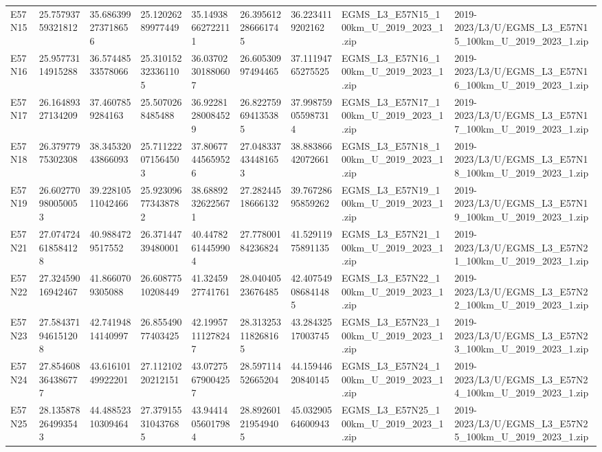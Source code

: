 \begin{landscape}
\begin{longtable}{lllllllll}
E57N15 & 25.75793759321812 & 35.686399273718656 & 25.12026289977449 & 35.14938662722111 & 26.395612286661745 & 36.2234119202162 & EGMS\_L3\_E57N15\_100km\_U\_2019\_2023\_1.zip & 2019-2023/L3/U/EGMS\_L3\_E57N15\_100km\_U\_2019\_2023\_1.zip \\
E57N16 & 25.95773114915288 & 36.57448533578066 & 25.310152323361105 & 36.03702301880607 & 26.60530997494465 & 37.11194765275525 & EGMS\_L3\_E57N16\_100km\_U\_2019\_2023\_1.zip & 2019-2023/L3/U/EGMS\_L3\_E57N16\_100km\_U\_2019\_2023\_1.zip \\
E57N17 & 26.16489327134209 & 37.4607859284163 & 25.5070268485488 & 36.92281280084529 & 26.822759694135385 & 37.998759055987314 & EGMS\_L3\_E57N17\_100km\_U\_2019\_2023\_1.zip & 2019-2023/L3/U/EGMS\_L3\_E57N17\_100km\_U\_2019\_2023\_1.zip \\
E57N18 & 26.37977975302308 & 38.34532043866093 & 25.711222071564503 & 37.80677445659526 & 27.048337434481653 & 38.88386642072661 & EGMS\_L3\_E57N18\_100km\_U\_2019\_2023\_1.zip & 2019-2023/L3/U/EGMS\_L3\_E57N18\_100km\_U\_2019\_2023\_1.zip \\
E57N19 & 26.602770980050053 & 39.22810511042466 & 25.923096773438782 & 38.68892326225671 & 27.28244518666132 & 39.76728695859262 & EGMS\_L3\_E57N19\_100km\_U\_2019\_2023\_1.zip & 2019-2023/L3/U/EGMS\_L3\_E57N19\_100km\_U\_2019\_2023\_1.zip \\
E57N21 & 27.074724618584128 & 40.9884729517552 & 26.37144739480001 & 40.44782614459904 & 27.77800184236824 & 41.52911975891135 & EGMS\_L3\_E57N21\_100km\_U\_2019\_2023\_1.zip & 2019-2023/L3/U/EGMS\_L3\_E57N21\_100km\_U\_2019\_2023\_1.zip \\
E57N22 & 27.32459016942467 & 41.8660709305088 & 26.60877510208449 & 41.3245927741761 & 28.04040523676485 & 42.407549086841485 & EGMS\_L3\_E57N22\_100km\_U\_2019\_2023\_1.zip & 2019-2023/L3/U/EGMS\_L3\_E57N22\_100km\_U\_2019\_2023\_1.zip \\
E57N23 & 27.584371946151208 & 42.74194814140997 & 26.85549077403425 & 42.19957111278247 & 28.313253118268165 & 43.28432517003745 & EGMS\_L3\_E57N23\_100km\_U\_2019\_2023\_1.zip & 2019-2023/L3/U/EGMS\_L3\_E57N23\_100km\_U\_2019\_2023\_1.zip \\
E57N24 & 27.854608364386777 & 43.61610149922201 & 27.11210220212151 & 43.07275679004257 & 28.59711452665204 & 44.15944620840145 & EGMS\_L3\_E57N24\_100km\_U\_2019\_2023\_1.zip & 2019-2023/L3/U/EGMS\_L3\_E57N24\_100km\_U\_2019\_2023\_1.zip \\
E57N25 & 28.135878264993543 & 44.48852310309464 & 27.379155310437685 & 43.94414056017984 & 28.892601219549405 & 45.03290564600943 & EGMS\_L3\_E57N25\_100km\_U\_2019\_2023\_1.zip & 2019-2023/L3/U/EGMS\_L3\_E57N25\_100km\_U\_2019\_2023\_1.zip \\

\end{longtable}
\end{landscape}
